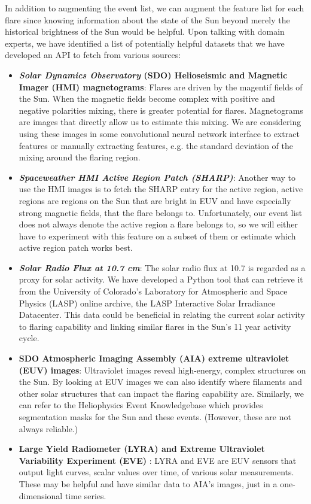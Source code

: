 \documentclass[letterpaper, 10 pt, onecolumn]{ieeeconf}
\begin{document}
In addition to augmenting the event list, we can augment the feature list for each flare since knowing information about the state of the Sun beyond merely the historical brightness of the Sun would be helpful. Upon talking with domain experts, we have identified a list of potentially helpful datasets that we have developed an API to fetch from various sources:
\begin{itemize}
    \item \textbf{\textit{Solar Dynamics Observatory} (SDO) Helioseismic and Magnetic Imager (HMI) magnetograms}: Flares are driven by the magentif fields of the Sun. When the magnetic fields become complex with positive and negative polarities mixing, there is greater potential for flares. Magnetograms are images that directly allow us to estimate this mixing. We are considering using these images in some convolutional neural network interface to extract features or manually extracting features, e.g. the standard deviation of the mixing around the flaring region. 
    \item \textbf{\textit{Spaceweather HMI Active Region Patch (SHARP)}}: Another way to use the HMI images is to fetch the SHARP entry for the active region, active regions are regions on the Sun that are bright in EUV and have especially strong magnetic fields, that the flare belongs to. Unfortunately, our event list does not always denote the active region a flare belongs to, so we will either have to experiment with this feature on a subset of them or estimate which active region patch works best. 
    \item \textbf{\textit{Solar Radio Flux at 10.7 cm}}: The solar radio flux at 10.7 is regarded as a proxy for solar activity. We have developed a Python tool that can retrieve it from the University of Colorado's Laboratory for Atmospheric and Space Physics (LASP) online archive, the LASP Interactive Solar Irradiance Datacenter. This data could be beneficial in relating the current solar activity to flaring capability and linking similar flares in the Sun's 11 year activity cycle. 
    \item \textbf{SDO Atmospheric Imaging Assembly (AIA) extreme ultraviolet (EUV) images}: Ultraviolet images reveal high-energy, complex structures on the Sun. By looking at EUV images we can also identify where filaments and other solar structures that can impact the flaring capability are. Similarly, we can refer to the Heliophysics Event Knowledgebase which provides segmentation masks for the Sun and these events. (However, these are not always reliable.) 
    \item \textbf{Large Yield Radiometer (LYRA) and Extreme Ultraviolet Variability Experiment (EVE) }: LYRA and EVE \cite{lyra} are EUV sensors that output light curves, scalar values over time, of various solar measurements. These may be helpful and have similar data to AIA's images, just in a one-dimensional time series. 
\end{itemize}
\end{document}
